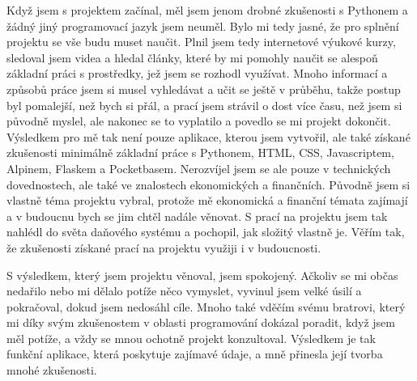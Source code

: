 \documentclass[11pt,a4paper,twoside,openright]{report}
\let\openright=\cleardoublepage
\begin{document}
Když jsem s projektem začínal, měl jsem jenom drobné zkušenosti s Pythonem a žádný jiný
programovací jazyk jsem neuměl. Bylo mi tedy jasné, že pro splnění projektu se vše budu muset
naučit.  Plnil jsem tedy internetové výukové kurzy, sledoval jsem videa a hledal články,
které by mi pomohly naučit se alespoň základní práci s prostředky, jež jsem se rozhodl využívat.
Mnoho informací a způsobů práce jsem si musel vyhledávat a učit se ještě v průběhu, takže
postup byl pomalejší, než bych si přál, a prací jsem strávil o dost více času, než jsem
si původně myslel, ale nakonec se to vyplatilo a povedlo se mi projekt dokončit. Výsledkem
pro mě tak není pouze aplikace, kterou jsem vytvořil, ale také získané zkušenosti minimálně
základní práce s Pythonem, HTML, CSS, Javascriptem, Alpinem, Flaskem a Pocketbasem. Nerozvíjel
jsem se ale pouze v technických dovednostech, ale také ve znalostech ekonomických a finančních.
Původně jsem si vlastně téma projektu vybral, protože mě ekonomická a finanční témata zajímají
a v budoucnu bych se jim chtěl nadále věnovat. S prací na projektu jsem tak nahlédl do světa
daňového systému a pochopil, jak složitý vlastně je. Věřím tak, že zkušenosti získané prací
na projektu využiji i v budoucnosti.

S výsledkem, který jsem projektu věnoval, jsem spokojený. Ačkoliv se mi občas nedařilo nebo mi
dělalo potíže něco vymyslet, vyvinul jsem velké úsilí a pokračoval, dokud jsem nedosáhl cíle.
Mnoho také vděčím svému bratrovi, který mi díky svým zkušenostem v oblasti programování dokázal
poradit, když jsem měl potíže, a vždy se mnou ochotně projekt konzultoval. Výsledkem je tak
funkční aplikace, která poskytuje zajímavé údaje, a mně přinesla její tvorba mnohé zkušenosti.

\nocite{einstein}\nocite{latexcompanion}\nocite{knuthwebsite}
\printbibliography[title={Seznam použité literatury},heading={bibintoc}]

\openright
\listoffigures
{}

\clearpage
\listoftables
{}


\end{document}
